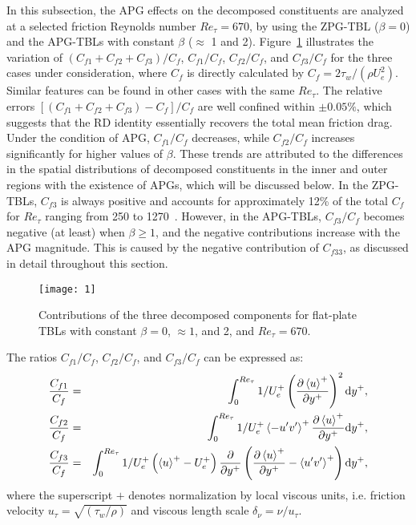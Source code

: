 In this subsection, the APG effects on the decomposed constituents are analyzed at a selected friction Reynolds number $Re_\tau=670$, by using the ZPG-TBL ($\beta=0$) and the APG-TBLs with constant $\beta$ ($\approx$ 1 and 2). 
Figure~\ref{beta_cf} illustrates the variation of $(C_{f1}+C_{f2}+C_{f3})/C_f$, $C_{f1}/C_f$, $C_{f2}/C_f$, and $C_{f3}/C_f$ for the three cases under consideration, where $C_f$ is directly calculated by $C_f=2\tau_w/(\rho U_e^2)$. Similar features can be found in other cases with the same $Re_\tau$. The relative errors $[(C_{f1}+C_{f2}+C_{f3})-C_f]/C_f$ are well confined within $\pm0.05\%$, which suggests that the RD identity essentially recovers the total mean friction drag. 
Under the condition of APG, $C_{f1}/C_f$ decreases, while $C_{f2}/C_f$ increases significantly for higher values of $\beta$. These trends are attributed to the differences in the spatial distributions of decomposed constituents in the inner and outer regions with the existence of APGs, which will be discussed below.  
In the ZPG-TBLs, $C_{f3}$ is always positive and accounts for approximately 12\% of the total $C_f$ for $Re_\tau$ ranging from 250 to 1270~\cite{Fan2019}.
However, in the APG-TBLs, $C_{f3}/C_f$ becomes negative (at least) when $\beta \ge 1$, and the negative contributions increase with the APG magnitude. This is caused by the negative contribution of $C_{f33}$, as discussed in detail throughout this section.


\begin{figure}[h]
\centering
{\texttt{[image: 1]}}
\caption{Contributions of the three decomposed components for flat-plate TBLs with constant $\beta=0$, $\approx1$, and 2, and $Re_\tau=670$. }
\label{beta_cf}
\end{figure}

The ratios $C_{f1}/C_f$, $C_{f2}/C_f$, and $C_{f3}/C_f$ can be expressed as: 
\begin{eqnarray}
\frac{C_{f1}}{C_f}&=&\int_{0}^{Re_\tau}1/U_e^+\left(\frac{\partial \left<u\right>^+}{\partial y^+}\right)^2{\rm d}y^+,\label{cf1_cf}
\\
\frac{C_{f2}}{C_f}&=&\int_{0}^{Re_\tau}1/U_e^+\left<-u'v'\right>^+\frac{\partial \left<u\right>^+}{\partial y^+}{\rm d}y^+,\label{cf2_cf}
\\
\frac{C_{f3}}{C_f}&=&\int_{0}^{Re_\tau}1/U_e^+\left(\left<u\right>^+-U_e^+\right)\frac{\partial}{\partial y^+}\left(\frac{\partial \left<u\right>^+}{\partial y^+}-\left<u'v'\right>^+\right){\rm d}y^+,\label{cf3_cf}
\end{eqnarray}
where the superscript $+$ denotes normalization by local viscous units, i.e. friction velocity $u_\tau=\sqrt{(\tau_w/\rho)}$ and viscous length scale  $\delta_\nu=\nu/u_\tau$.

